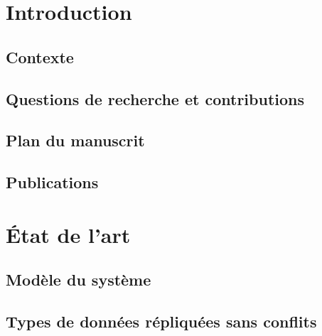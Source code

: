 \documentclass[12pt]{thesul}
\theoremstyle{definition}
\begin{document}
\DontWriteThisInToc
\listoffigures

\mainmatter
\NumberThisInToc
\chapter{Introduction}
\minitoc

\section{Contexte}


\section{Questions de recherche et contributions}


\section{Plan du manuscrit}


\section{Publications}


\NumberThisInToc
\chapter{État de l'art}
\minitoc
\label{chap:state-of-art}

\section{Modèle du système}


% 

% 

\section{Types de données répliquées sans conflits}

\end{document}
